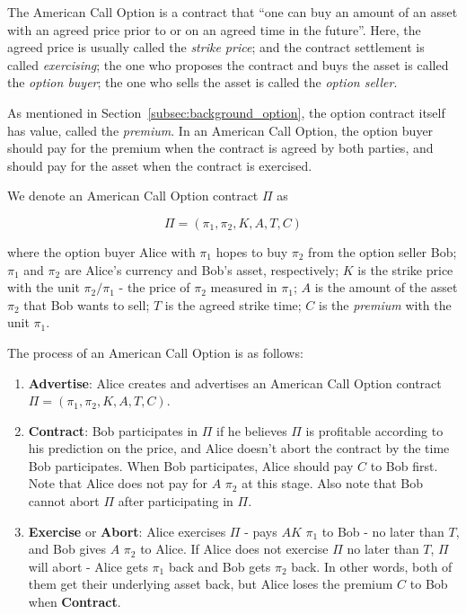 The American Call Option is a contract that ``one can buy an amount of an asset with an agreed price prior to or on an agreed time in the future''. 
Here,
the agreed price is usually called the \textit{strike price};
and the contract settlement is called \textit{exercising};
the one who proposes the contract and buys the asset is called the \textit{option buyer};
the one who sells the asset is called the \textit{option seller}.

As mentioned in Section~\ref{subsec:background_option}, the option contract itself has value, called the \textit{premium}.
In an American Call Option, the option buyer should pay for the premium when the contract is agreed by both parties, and should pay for the asset when the contract is exercised.

We denote an American Call Option contract $\Pi$ as

$$\Pi = (\pi_1, \pi_2, K, A, T, C)$$

where
the option buyer Alice with $\pi_1$ hopes to buy $\pi_2$ from the option seller Bob;
$\pi_1$ and $\pi_2$ are Alice's currency and Bob's asset, respectively; 
$K$ is the strike price with the unit $\pi_2 / \pi_1$ - the price of $\pi_2$ measured in $\pi_1$;
$A$ is the amount of the asset $\pi_2$ that Bob wants to sell;
$T$ is the agreed strike time;
$C$ is the \textit{premium} with the unit $\pi_1$.

The process of an American Call Option is as follows:

\begin{enumerate}
    \item \textbf{Advertise}: Alice creates and advertises an American Call Option contract $\Pi = (\pi_1, \pi_2, K, A, T, C)$.
    \item \textbf{Contract}: Bob participates in $\Pi$ if he believes $\Pi$ is profitable according to his prediction on the price, and Alice doesn't abort the contract by the time Bob participates.
    When Bob participates, Alice should pay $C$ to Bob first.
    Note that Alice does not pay for $A$ $\pi_2$ at this stage.
    Also note that Bob cannot abort $\Pi$ after participating in $\Pi$.
    \item \textbf{Exercise} or \textbf{Abort}: Alice exercises $\Pi$ - pays $AK$ $\pi_1$ to Bob - no later than $T$, and Bob gives $A$ $\pi_2$ to Alice.
    If Alice does not exercise $\Pi$ no later than $T$, $\Pi$ will abort - Alice gets $\pi_1$ back and Bob gets $\pi_2$ back.
    In other words, both of them get their underlying asset back, but Alice loses the premium $C$ to Bob when \textbf{Contract}.
\end{enumerate}












